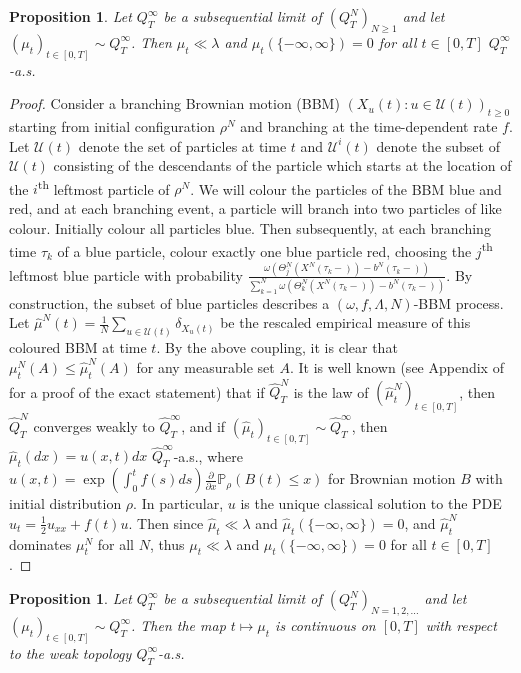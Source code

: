 \documentclass{article}
\newtheorem{propn}[theorem]{Proposition}
\newcommand{\B}[1]{\mathbb{#1}}
\newcommand{\C}[1]{\mathcal{#1}}
\begin{document}
 

\begin{propn}
    Let $Q^\infty_T$ be a subsequential limit of $(Q^N_T)_{N\geq 1}$ and let $(\mu_t)_{t\in [0,T]}\sim Q^\infty_T$. Then $\mu_t\ll\lambda$ and $\mu_t(\{-\infty,\infty\})=0$ for all $t\in [0,T]$ $Q_T^\infty$-a.s. 
\end{propn}

\begin{proof}
    Consider a branching Brownian motion (BBM) $(X_u(t):u\in\C{U}(t))_{t\geq 0}$ starting from initial configuration $\rho^N$ and branching at the time-dependent rate $f$. Let $\C{U}(t)$ denote the set of particles at time $t$ and $\C{U}^i(t)$ denote the subset of $\C{U}(t)$ consisting of the descendants of the particle which starts at the location of the $i$\textsuperscript{th} leftmost particle of $\rho^N$. We will colour the particles of the BBM blue and red, and at each branching event, a particle will branch into two particles of like colour. 
    Initially colour all particles blue. Then subsequently, at each branching time $\tau_k$ of a blue particle, colour exactly one blue particle red, choosing the $j$\textsuperscript{th} leftmost blue particle with probability $\frac{\omega(\Theta^N_j(X^N(\tau_k-))-b^N(\tau_k-))}{\sum_{k=1}^N\omega(\Theta^N_k(X^N(\tau_k-))-b^N(\tau_k-))}$. By construction, the subset of blue particles describes a $(\omega,f,\Lambda,N)$-BBM process. Let $\hat{\mu}^N(t)=\frac1N\sum_{u\in\C{U}(t)}\delta_{X_u(t)}$ be the rescaled empirical measure of this coloured BBM at time $t$. By the above coupling, it is clear that $\mu_t^N(A)\leq \hat{\mu}_t^N(A)$ for any measurable set $A$. It is well known (see Appendix of \cite{me3} for a proof of the exact statement) that if $\hat{Q}^N_T$ is the law of $(\hat{\mu}^N_t)_{t\in [0,T]}$, then $\hat{Q}^N_T$ converges weakly to $\hat{Q}^\infty_T$, and if $(\hat{\mu}_t)_{t\in [0,T]}\sim \hat{Q}^\infty_T$, then $\hat{\mu}_t(dx)=u(x,t)dx$ $\hat{Q}^\infty_T$-a.s., where $u(x,t)=\exp(\int_0^t f(s)ds)\frac{\partial}{\partial x}\B{P}_\rho(B(t)\leq x)$ for Brownian motion $B$ with initial distribution $\rho$. In particular, $u$ is the unique classical solution to the PDE $u_t = \frac12 u_{xx}+f(t)u$. Then since $\hat{\mu}_t\ll \lambda$ and $\hat{\mu}_t(\{-\infty,\infty\})=0$, and $\hat{\mu}^N_t$ dominates $\mu_t^N$ for all $N$, thus $\mu_t\ll \lambda$ and $\mu_t(\{-\infty,\infty\})=0$ for all $t\in [0,T]$. 
\end{proof}

 

\begin{propn} \label{vagueContinuity}
    Let $Q^\infty_T$ be a subsequential limit of $(Q^N_T)_{N=1,2,\ldots}$ and let $(\mu_t)_{t\in [0,T]}\sim Q^\infty_T$. Then the map $t\mapsto \mu_t$ is continuous on $[0,T]$ with respect to the weak topology $Q^\infty_T$-a.s.
\end{propn}
\end{document}
